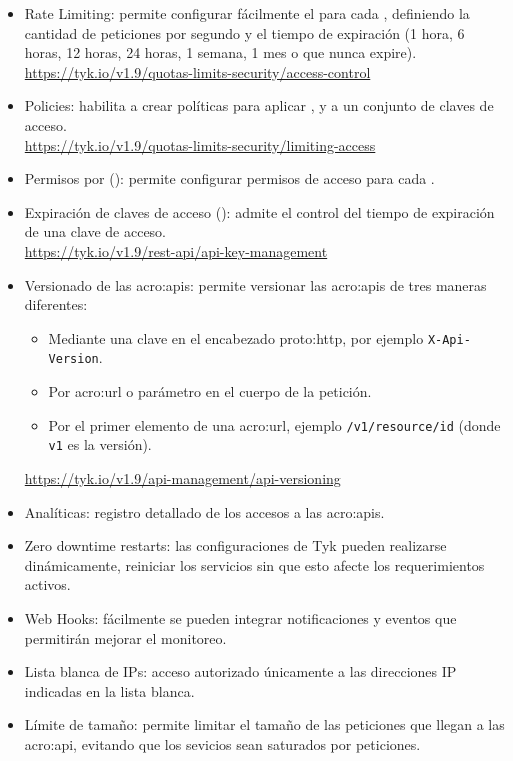 \begin{itemize}
  \item Rate Limiting: permite configurar fácilmente el  para cada , definiendo la cantidad de peticiones por segundo y el tiempo de expiración (1 hora, 6 horas, 12 horas, 24 horas, 1 semana, 1 mes o que nunca expire). \\
  \url{https://tyk.io/v1.9/quotas-limits-security/access-control}
  \item Policies: habilita a crear políticas para aplicar ,  y  a un conjunto de claves de acceso. \\
  \url{https://tyk.io/v1.9/quotas-limits-security/limiting-access}
  \item Permisos por  (): permite configurar permisos de acceso para cada .
  \item Expiración de claves de acceso (): admite el control del tiempo de expiración de una clave de acceso. \\
  \url{https://tyk.io/v1.9/rest-api/api-key-management}
  \item Versionado de las \glspl{acro:api}: permite versionar las \glspl{acro:api} de tres maneras diferentes:
  \begin{itemize}
    \item Mediante una clave en el encabezado \gls{proto:http}, por ejemplo \texttt{X-Api-Version}.
    \item Por \gls{acro:url} o parámetro en el cuerpo de la petición.
    \item Por el primer elemento de una \gls{acro:url}, ejemplo \texttt{/v1/resource/id} (donde \texttt{v1} es la versión).
  \end{itemize}
  \url{https://tyk.io/v1.9/api-management/api-versioning}
  \item Analíticas: registro detallado de los accesos a las \glspl{acro:api}.
  \item Zero downtime restarts: las configuraciones de Tyk pueden realizarse dinámicamente, reiniciar los servicios sin que esto afecte los requerimientos activos.
  \item Web Hooks: fácilmente se pueden integrar notificaciones y eventos que permitirán mejorar el monitoreo.
  \item Lista blanca de IPs: acceso autorizado únicamente a las direcciones IP indicadas en la lista blanca.
  \item Límite de tamaño: permite limitar el tamaño de las peticiones que llegan a las \gls{acro:api}, evitando que los sevicios sean saturados por peticiones.

\end{itemize}
